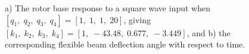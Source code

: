 \documentclass[12pt]{report}
\begin{document}
\begin{enumerate}
{              \begin{figure}[htb!]
                  \caption{a) The rotor base response to a square wave input when $[q_1,\; q_2,\; q_3,\; q_4] = [1,\; 1,\; 1,\; 20]$, giving $[k_1,\; k_2,\; k_3,\; k_4] = [1,\; -43.48,\; 0.677,\; -3.449]$, and b) the corresponding flexible beam deflection angle with respect to time.}
              \end{figure}}


\end{enumerate}
\end{document}
